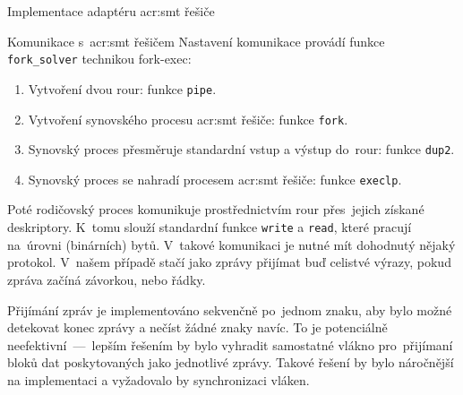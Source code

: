\documentclass[thesis=M,czech]{FITthesis}[2012/06/26]
\newcommand{\acrlabel}[1]{acr:#1}
\newcommand{\acr}[1]{\acrshort{\acrlabel{#1}}}
\newcommand{\id}[1]{\texttt{#1}}
\begin{document}
\begin{section}{Implementace adaptéru \acr{smt} řešiče}
\begin{paragraph}{Komunikace s~\acr{smt} řešičem}
Nastavení komunikace provádí funkce \id{fork\_\-solver}
technikou fork-exec:
\begin{enumerate}
\item Vytvoření dvou rour: funkce \id{pipe}.
\item Vytvoření synovského procesu \acr{smt} řešiče: funkce \id{fork}.
\item Synovský proces přesměruje standardní vstup a výstup do~rour:
   funkce \id{dup2}.
\item Synovský proces se nahradí procesem \acr{smt} řešiče:
   funkce \id{execlp}.
\end{enumerate}

Poté rodičovský proces komunikuje prostřednictvím rour
přes~jejich získané deskriptory.
K~tomu slouží standardní funkce \id{write} a \id{read},
které pracují na~úrovni (binárních) bytů.
V~takové komunikaci je nutné mít dohodnutý nějaký protokol.
V~našem případě stačí jako zprávy přijímat
buď celistvé výrazy, pokud zpráva začíná závorkou,
nebo řádky.

Přijímání zpráv je implementováno sekvenčně po~jednom znaku,
aby bylo možné detekovat konec zprávy a nečíst žádné znaky navíc.
To je potenciálně neefektivní~---~lepším řešením by bylo
vyhradit samostatné vlákno pro~přijímaní bloků dat
poskytovaných jako jednotlivé zprávy.
Takové řešení by bylo náročnější na implementaci
a vyžadovalo by synchronizaci vláken.
\end{paragraph} %


\end{section} %

\end{document}
